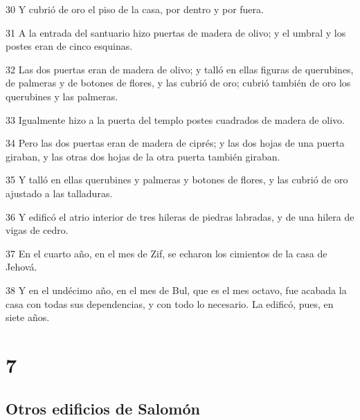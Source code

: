 \par 30 Y cubrió de oro el piso de la casa, por dentro y por fuera.
\par 31 A la entrada del santuario hizo puertas de madera de olivo; y el umbral y los postes eran de cinco esquinas.
\par 32 Las dos puertas eran de madera de olivo; y talló en ellas figuras de querubines, de palmeras y de botones de flores, y las cubrió de oro; cubrió también de oro los querubines y las palmeras.
\par 33 Igualmente hizo a la puerta del templo postes cuadrados de madera de olivo.
\par 34 Pero las dos puertas eran de madera de ciprés; y las dos hojas de una puerta giraban, y las otras dos hojas de la otra puerta también giraban.
\par 35 Y talló en ellas querubines y palmeras y botones de flores, y las cubrió de oro ajustado a las talladuras.
\par 36 Y edificó el atrio interior de tres hileras de piedras labradas, y de una hilera de vigas de cedro.
\par 37 En el cuarto año, en el mes de Zif, se echaron los cimientos de la casa de Jehová.
\par 38 Y en el undécimo año, en el mes de Bul, que es el mes octavo, fue acabada la casa con todas sus dependencias, y con todo lo necesario. La edificó, pues, en siete años.

\chapter{7}

\section*{Otros edificios de Salomón}

